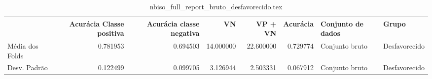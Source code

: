 \begin{table}
\centering
\caption{nbiso_full_report_bruto_desfavorecido.tex}
\label{nbiso_full_report_bruto_desfavorecido.tex}
\begin{tabular}{lrrrrrll}
\toprule
{} &  Acurácia Classe positiva &  Acurácia classe negativa &        VN  &   VP + VN  &  Acurácia & Conjunto de dados &          Grupo \\
\midrule
Média dos Folds &                  0.781953 &                  0.694503 &  14.000000 &  22.600000 &  0.729774 &    Conjunto bruto &  Desfavorecido \\
Desv. Padrão    &                  0.122499 &                  0.099705 &   3.126944 &   2.503331 &  0.067912 &    Conjunto bruto &  Desfavorecido \\
\bottomrule
\end{tabular}
\end{table}
